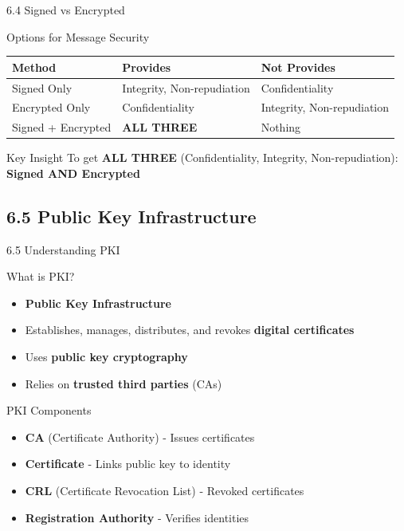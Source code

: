 \documentclass{beamer}
\begin{document}
	\begin{frame}{6.4 Signed vs Encrypted}
		\begin{block}{Options for Message Security}
			\begin{tabular}{|p{3cm}|p{4cm}|p{4cm}|}
				\hline
				\textbf{Method} & \textbf{Provides} & \textbf{Not Provides} \\
				\hline
				Signed Only & Integrity, Non-repudiation & Confidentiality \\
				\hline
				Encrypted Only & Confidentiality & Integrity, Non-repudiation \\
				\hline
				Signed + Encrypted & \textbf{ALL THREE} & Nothing \\
				\hline
			\end{tabular}
		\end{block}
		
		\begin{exampleblock}{Key Insight}
			To get \textbf{ALL THREE} (Confidentiality, Integrity, Non-repudiation): \\
			\textbf{Signed AND Encrypted}
		\end{exampleblock}
	\end{frame}
	
	\subsection{6.5 Public Key Infrastructure}
	\begin{frame}{6.5 Understanding PKI}
		\begin{block}{What is PKI?}
			\begin{itemize}
				\item \textbf{Public Key Infrastructure}
				\item Establishes, manages, distributes, and revokes \textbf{digital certificates}
				\item Uses \textbf{public key cryptography}
				\item Relies on \textbf{trusted third parties} (CAs)
			\end{itemize}
		\end{block}
		
		\begin{block}{PKI Components}
			\begin{itemize}
				\item \textbf{CA} (Certificate Authority) - Issues certificates
				\item \textbf{Certificate} - Links public key to identity
				\item \textbf{CRL} (Certificate Revocation List) - Revoked certificates
				\item \textbf{Registration Authority} - Verifies identities
			\end{itemize}
		\end{block}
	\end{frame}
	
\end{document}
